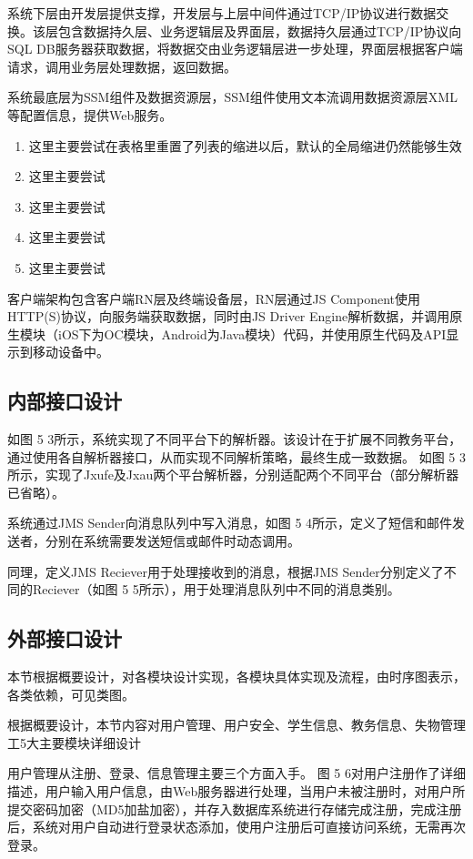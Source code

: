\documentclass[oneside]{jufethesis}
\begin{document}
系统下层由开发层提供支撑，开发层与上层中间件通过TCP/IP协议进行数据交换。该层包含数据持久层、业务逻辑层及界面层，数据持久层通过TCP/IP协议向SQL DB服务器获取数据，将数据交由业务逻辑层进一步处理，界面层根据客户端请求，调用业务层处理数据，返回数据。

系统最底层为SSM组件及数据资源层，SSM组件使用文本流调用数据资源层XML等配置信息，提供Web服务。

\begin{enumerate}[(1)]
  \item 这里主要尝试在表格里重置了列表的缩进以后，默认的全局缩进仍然能够生效
  \item 这里主要尝试
  \item 这里主要尝试
  \item 这里主要尝试
  \item 这里主要尝试
\end{enumerate}

客户端架构包含客户端RN层及终端设备层，RN层通过JS Component使用HTTP(S)协议，向服务端获取数据，同时由JS Driver Engine解析数据，并调用原生模块（iOS下为OC模块，Android为Java模块）代码，并使用原生代码及API显示到移动设备中。

\subsection{内部接口设计}

如图 5 3所示，系统实现了不同平台下的解析器。该设计在于扩展不同教务平台，通过使用各自解析器接口，从而实现不同解析策略，最终生成一致数据。
如图 5 3所示，实现了Jxufe及Jxau两个平台解析器，分别适配两个不同平台（部分解析器已省略）。

系统通过JMS Sender向消息队列中写入消息，如图 5 4所示，定义了短信和邮件发送者，分别在系统需要发送短信或邮件时动态调用。

同理，定义JMS Reciever用于处理接收到的消息，根据JMS Sender分别定义了不同的Reciever（如图 5 5所示），用于处理消息队列中不同的消息类别。

\subsection{外部接口设计}
本节根据概要设计，对各模块设计实现，各模块具体实现及流程，由时序图表示，各类依赖，可见类图。

根据概要设计，本节内容对用户管理、用户安全、学生信息、教务信息、失物管理工5大主要模块详细设计

用户管理从注册、登录、信息管理主要三个方面入手。
图 5 6对用户注册作了详细描述，用户输入用户信息，由Web服务器进行处理，当用户未被注册时，对用户所提交密码加密（MD5加盐加密），并存入数据库系统进行存储完成注册，完成注册后，系统对用户自动进行登录状态添加，使用户注册后可直接访问系统，无需再次登录。
 
\end{document}
